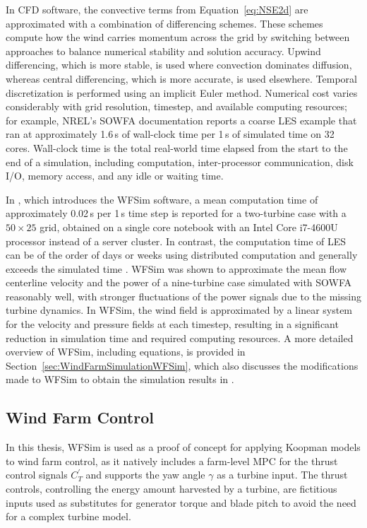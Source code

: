 In CFD software, the convective terms from Equation~\eqref{eq:NSE2d} are approximated with a combination of differencing schemes. These schemes compute how the wind carries momentum across the grid by switching between approaches to balance numerical stability and solution accuracy. Upwind differencing, which is more stable, is used where convection dominates diffusion, whereas central differencing, which is more accurate, is used elsewhere. Temporal discretization is performed using an implicit Euler method.
%
Numerical cost varies considerably with grid resolution, timestep, and available computing resources; for example, NREL's SOWFA documentation \cite{churchfield2012overview} reports a coarse LES example that ran at approximately 1.6\,s of wall-clock time per 1\,s of simulated time on 32 cores. Wall-clock time is the total real-world time elapsed from the start to the end of a simulation, including computation, inter-processor communication, disk I/O, memory access, and any idle or waiting time.

In \cite{boersma2018control}, which introduces the WFSim software, a mean computation time of approximately 0.02\,s per 1\,s time step is reported for a two-turbine case with a $50 \times 25$ grid, obtained on a single core notebook with an Intel Core i7-4600U processor instead of a server cluster. In contrast, the computation time of LES can be of the order of days or weeks using distributed computation and generally exceeds the simulated time \cite{boersma2018control}. WFSim was shown to approximate the mean flow centerline velocity and the power of a nine-turbine case simulated with SOWFA reasonably well, with stronger fluctuations of the power signals due to the missing turbine dynamics.
%
In WFSim, the wind field is approximated by a linear system for the velocity and pressure fields at each timestep, resulting in a significant reduction in simulation time and required computing resources. A more detailed overview of WFSim, including equations, is provided in Section~\ref{sec:WindFarmSimulationWFSim}, which also discusses the modifications made to WFSim to obtain the simulation results in \cite{dittmer2022data,dittmer2023koopman}.

\subsection{Wind Farm Control}\label{Subsection:Windfarmcontrol}
In this thesis, WFSim is used as a proof of concept for applying Koopman models to wind farm control, as it natively includes a farm-level MPC for the thrust control signals $C_T^{\prime}$ and supports the yaw angle $\gamma$ as a turbine input. The thrust controls, controlling the energy amount harvested by a turbine, are fictitious inputs used as substitutes for generator torque and blade pitch to avoid the need for a complex turbine model.

